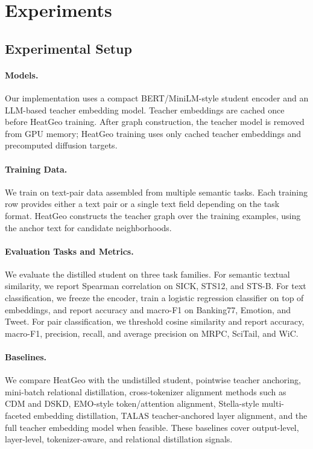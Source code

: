 \section{Experiments}
\label{sec:experiments}

\subsection{Experimental Setup}

\paragraph{Models.}
Our implementation uses a compact BERT/MiniLM-style student encoder and an LLM-based teacher embedding model. Teacher embeddings are cached once before HeatGeo training. After graph construction, the teacher model is removed from GPU memory; HeatGeo training uses only cached teacher embeddings and precomputed diffusion targets.

\paragraph{Training Data.}
We train on text-pair data assembled from multiple semantic tasks. Each training row provides either a text pair or a single text field depending on the task format. HeatGeo constructs the teacher graph over the training examples, using the anchor text for candidate neighborhoods.

\paragraph{Evaluation Tasks and Metrics.}
We evaluate the distilled student on three task families. For semantic textual similarity, we report Spearman correlation on SICK, STS12, and STS-B. For text classification, we freeze the encoder, train a logistic regression classifier on top of embeddings, and report accuracy and macro-F1 on Banking77, Emotion, and Tweet. For pair classification, we threshold cosine similarity and report accuracy, macro-F1, precision, recall, and average precision on MRPC, SciTail, and WiC.

\paragraph{Baselines.}
We compare HeatGeo with the undistilled student, pointwise teacher anchoring, mini-batch relational distillation, cross-tokenizer alignment methods such as CDM and DSKD, EMO-style token/attention alignment, Stella-style multi-faceted embedding distillation, TALAS teacher-anchored layer alignment, and the full teacher embedding model when feasible. These baselines cover output-level, layer-level, tokenizer-aware, and relational distillation signals.

